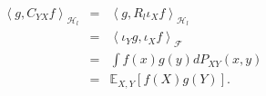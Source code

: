 \documentclass[english]{article}
\theoremstyle{definition}
\theoremstyle{plain}
\theoremstyle{definition}
\begin{document}
\begin{eqnarray*}
\left\langle g,C_{YX}f\right\rangle _{\mathcal{H}_{l}} & = & \left\langle g,R_{l}\iota_{X}f\right\rangle _{\mathcal{H}_{l}}\\
 & = & \left\langle \iota_{Y}g,\iota_{X}f\right\rangle _{\mathcal{F}}\\
 & = & \int f(x)g(y)dP_{XY}(x,y)\\
 & = & \mathbb{E}_{X,Y}\left[f(X)g(Y)\right].
\end{eqnarray*}
\end{document}
